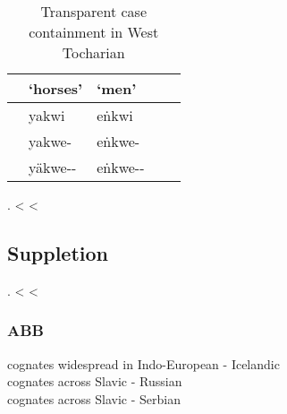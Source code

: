 \begin{table}[h]
  \center
	\caption {Transparent case containment in West Tocharian \citep[23-24]{gippert1987}}
	\begin{minipage}{0.6\linewidth}
		\begin{tabularx}{\textwidth}{c *{4}{Z}}
		\toprule
              & `horses'
              & `men'                                  \\
		\midrule
     & yakwi
              & eṅkwi                                  \\
     & yakwe-
              & eṅkwe-                          \\
     & yäkwe--\textcolor{DG}{}
              & eṅkwe--\textcolor{DG}{} \\
		\bottomrule
		\end{tabularx}
	\end{minipage}
\end{table}

\ex.  <  < 

\phantom{x}

\subsection{Suppletion}

\ex.  <  < 

\phantom{x}

\subsubsection{ABB}


cognates widespread in Indo-European - Icelandic\\
cognates across Slavic - Russian\\
cognates across Slavic - Serbian




